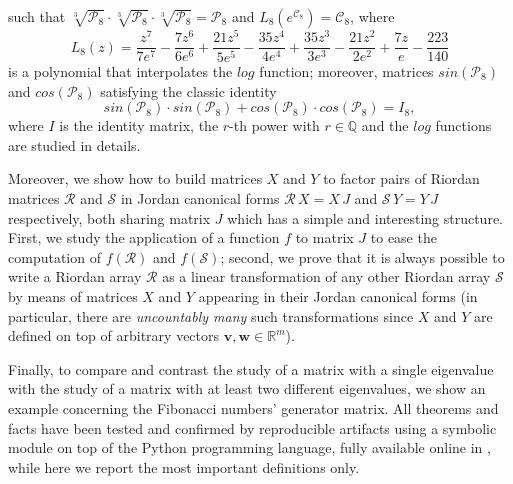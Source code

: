such that %
$\sqrt[3]{\mathcal{P}_8} \cdot \sqrt[3]{\mathcal{P}_8} \cdot
\sqrt[3]{\mathcal{P}_8} =\mathcal{P}_8$ and
$L_{8}\left({e^{\mathcal{C}_{8}}}\right) = \mathcal{C}_{8}$, where
\begin{displaymath}
{L_{ 8 }}{\left (z \right )} = \frac{z^{7}}{7 e^{7}} - \frac{7 z^{6}}{6 e^{6}} + \frac{21 z^{5}}{5 e^{5}} - \frac{35 z^{4}}{4 e^{4}} + \frac{35 z^{3}}{3 e^{3}} - \frac{21 z^{2}}{2 e^{2}} + \frac{7 z}{e} - \frac{223}{140}
\end{displaymath}
is a polynomial that interpolates the $log$ function; moreover, matrices
$sin(\mathcal{P}_8)$ and $cos(\mathcal{P}_8)$ satisfying the classic identity
\begin{equation}
sin(\mathcal{P}_8)\cdot sin(\mathcal{P}_8)+ cos(\mathcal{P}_8)\cdot
cos(\mathcal{P}_8)=I_{8},
\label{eq:matrices:functions:sin:cos:identity}
\end{equation}
where $I$ is the identity matrix, the $r$-th power
with $r\in\mathbb{Q}$ and the $log$ functions are studied in details.

Moreover, we show how to build matrices $X$ and $Y$ to factor pairs of Riordan
matrices $\mathcal{R}$ and $\mathcal{S}$ in  Jordan canonical forms
$\mathcal{R}\,X=X\,J$ and $\mathcal{S}\,Y=Y\,J$ respectively, both sharing
matrix $J$ which has a simple and interesting structure. First, we study the
application of a function $f$ to matrix $J$  to ease the computation of
$f(\mathcal{R})$ and $f(\mathcal{S})$; second, we prove that it is always
possible to write a Riordan array $\mathcal{R}$ as a linear transformation of
any other Riordan array $\mathcal{S}$ by means of matrices $X$ and $Y$
appearing in their Jordan canonical forms (in particular, there are
\textit{uncountably many} such transformations since $X$ and $Y$ are defined on
top of arbitrary vectors $\boldsymbol{v},\boldsymbol{w}\in\mathbb{R}^{m}$).

Finally, to compare and contrast the study of a matrix with a single eigenvalue
with the study of a matrix with at least two different eigenvalues, we show an
example concerning the Fibonacci numbers' generator matrix.  All theorems and
facts have been tested and confirmed by reproducible artifacts using a symbolic
module on top of the Python programming language, fully available online in
\citep{MN:simulation:method:repo}, while here we report the most important
definitions only.


